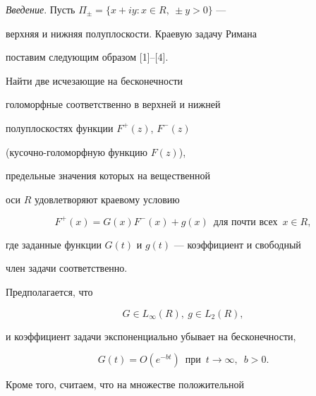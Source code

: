 

\maketitle


\label{begin}








{\it Введение}. Пусть $\Pi_\pm=\{x+iy : x\in R,\ \pm y>0\}$ ---


верхняя и нижняя полуплоскости. Краевую задачу Римана


поставим следующим образом [1]--[4].


Найти две исчезающие на бесконечности


голоморфные соответственно в верхней и нижней


полуплоскостях функции $F^+(z)$, $F^-(z)$


(кусочно-голоморфную функцию $F(z)$),


предельные значения которых на вещественной


оси $R$ удовлетворяют краевому условию


\begin{equation}


F^+(x)=G(x)F^-(x)+g(x)\ \; \text{для почти всех}\ \; x\in R,


\end{equation}


где заданные функции $G(t)$ и $g(t)$ --- коэффициент и свободный


член задачи соответственно.





Предполагается, что


\begin{equation}


G\in L_\infty (R),\ g\in L_2(R),


\end{equation}


и коэффициент задачи экспоненциально убывает на бесконечности,


\begin{equation}


G(t)=O(e^{-bt})\ \; \text{при}\ \; t\to \infty,\ \; b>0.


\end{equation}


Кроме того, считаем, что на множестве положительной


